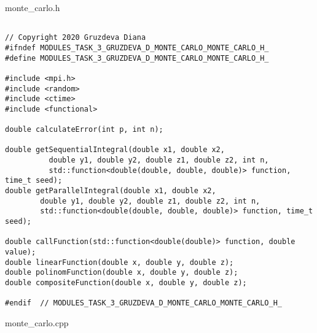 \documentclass{report}
\begin{document}
monte\_carlo.h
\begin{lstlisting}

// Copyright 2020 Gruzdeva Diana
#ifndef MODULES_TASK_3_GRUZDEVA_D_MONTE_CARLO_MONTE_CARLO_H_
#define MODULES_TASK_3_GRUZDEVA_D_MONTE_CARLO_MONTE_CARLO_H_

#include <mpi.h>
#include <random>
#include <ctime>
#include <functional>

double calculateError(int p, int n);

double getSequentialIntegral(double x1, double x2,
          double y1, double y2, double z1, double z2, int n,
          std::function<double(double, double, double)> function, time_t seed);
double getParallelIntegral(double x1, double x2,
        double y1, double y2, double z1, double z2, int n,
        std::function<double(double, double, double)> function, time_t seed);

double callFunction(std::function<double(double)> function, double value);
double linearFunction(double x, double y, double z);
double polinomFunction(double x, double y, double z);
double compositeFunction(double x, double y, double z);

#endif  // MODULES_TASK_3_GRUZDEVA_D_MONTE_CARLO_MONTE_CARLO_H_
\end{lstlisting}
monte\_carlo.cpp
\end{document}
